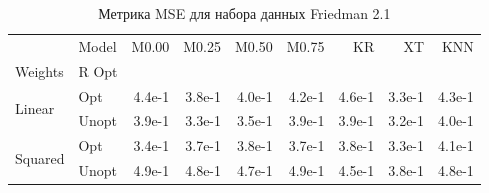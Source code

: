 \begin{table}
\caption{Метрика MSE для набора данных Friedman 2.1}
\label{tab:MSE_Friedman 2.1}
\begin{tabular}{llrrrrrrr}
\toprule
 & Model & M0.00 & M0.25 & M0.50 & M0.75 & KR & XT & KNN \\
Weights & R Opt &  &  &  &  &  &  &  \\
\midrule
\multirow[t]{2}{*}{Linear} & Opt & 4.4e-1 & 3.8e-1 & 4.0e-1 & 4.2e-1 & 4.6e-1 & 3.3e-1 & 4.3e-1 \\
 & Unopt & 3.9e-1 & 3.3e-1 & 3.5e-1 & 3.9e-1 & 3.9e-1 & 3.2e-1 & 4.0e-1 \\

\multirow[t]{2}{*}{Squared} & Opt & 3.4e-1 & 3.7e-1 & 3.8e-1 & 3.7e-1 & 3.8e-1 & 3.3e-1 & 4.1e-1 \\
 & Unopt & 4.9e-1 & 4.8e-1 & 4.7e-1 & 4.9e-1 & 4.5e-1 & 3.8e-1 & 4.8e-1 \\

\bottomrule
\end{tabular}
\end{table}
